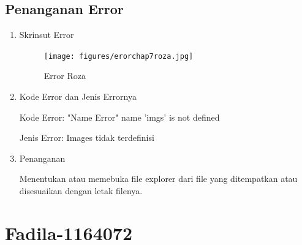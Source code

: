 \begin{enumerate}
\subsection{Penanganan Error}
\begin{enumerate}

\item Skrinsut Error
\begin{figure}[ht]
\centering
\texttt{[image: figures/erorchap7roza.jpg]}
\caption{ Error Roza}
\label{6}
\end{figure}
\item Kode Error dan Jenis Errornya
\par Kode Error: "Name Error" name 'imgs'  is not defined
\par Jenis Error: Images tidak terdefinisi
\item Penanganan
\par Menentukan atau memebuka file explorer dari file yang ditempatkan atau disesuaikan dengan letak filenya.

\end{enumerate}
\end{enumerate}








\section{Fadila-1164072}
